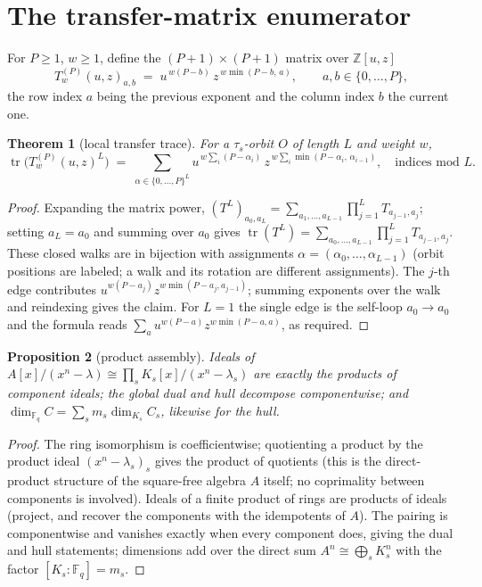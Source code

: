 \documentclass[10pt,journal,draftclsnofoot,onecolumn]{IEEEtran}
\newtheorem{theorem}{Theorem}[section]
\newtheorem{proposition}[theorem]{Proposition}
\theoremstyle{definition}
\theoremstyle{remark}
\newcommand{\Fq}{\mathbb{F}_q}
\newcommand{\Z}{\mathbb{Z}}
\newcommand{\tr}{\operatorname{tr}}
\begin{document}
\section{The transfer-matrix enumerator}\label{sec:enumerator}

For \(P \ge 1\), \(w \ge 1\), define the \((P{+}1)\times(P{+}1)\) matrix
over \(\Z[u,z]\)
\[
T^{(P)}_w(u,z)_{a,b} \;=\; u^{\,w(P-b)}\, z^{\,w \min(P-b,\, a)},
\qquad a, b \in \{0,\dots,P\},
\]
the row index \(a\) being the previous exponent and the column index
\(b\) the current one.

\begin{theorem}[local transfer trace]\label{thm:T5}
For a \(\tau_s\)-orbit \(O\) of length \(L\) and weight \(w\),
\[
\tr\!\big(T^{(P)}_w(u,z)^L\big)
\;=\; \sum_{\alpha \in \{0,\dots,P\}^L}
u^{\,w \sum_i (P-\alpha_i)}\,
z^{\,w \sum_i \min(P-\alpha_i,\, \alpha_{i-1})},
\quad \text{indices mod } L.
\]
\end{theorem}

\begin{proof}
Expanding the matrix power,
\((T^L)_{a_0,a_L} = \sum_{a_1,\dots,a_{L-1}} \prod_{j=1}^{L} T_{a_{j-1},a_j}\);
setting \(a_L = a_0\) and summing over \(a_0\) gives
\(\tr(T^L) = \sum_{a_0,\dots,a_{L-1}} \prod_{j=1}^{L} T_{a_{j-1},a_j}\).
These closed walks are in bijection with assignments
\(\alpha = (\alpha_0,\dots,\alpha_{L-1})\) (orbit positions are labeled;
a walk and its rotation are different assignments). The \(j\)-th edge
contributes \(u^{w(P-a_j)} z^{w\min(P-a_j, a_{j-1})}\); summing exponents
over the walk and reindexing gives the claim. For \(L=1\) the single edge
is the self-loop \(a_0 \to a_0\) and the formula reads
\(\sum_a u^{w(P-a)} z^{w\min(P-a,a)}\), as required.
\end{proof}

\begin{proposition}[product assembly]\label{prop:assembly}
Ideals of \(A[x]/(x^n-\lambda) \cong \prod_s K_s[x]/(x^n-\lambda_s)\) are
exactly the products of component ideals; the global dual and hull
decompose componentwise; and
\(\dim_{\Fq} C = \sum_s m_s \dim_{K_s} C_s\), likewise for the hull.
\end{proposition}

\begin{proof}
The ring isomorphism is coefficientwise; quotienting a product by the
product ideal \((x^n-\lambda_s)_s\) gives the product of quotients (this
is the direct-product structure of the square-free algebra \(A\) itself;
no coprimality between components is involved). Ideals of a finite
product of rings are products of ideals (project, and recover the
components with the idempotents of \(A\)). The pairing is componentwise
and vanishes exactly when every component does, giving the dual and hull
statements; dimensions add over the direct sum \(A^n \cong \bigoplus_s
K_s^n\) with the factor \([K_s:\Fq] = m_s\).
\end{proof}
\end{document}
